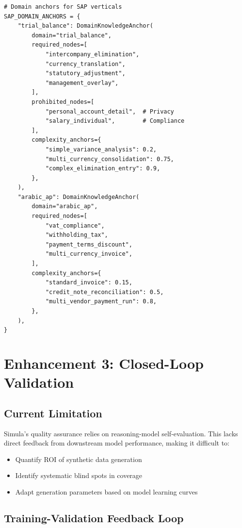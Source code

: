 \begin{lstlisting}[language=jsonx,caption={SAP S/4HANA domain calibration.}]
# Domain anchors for SAP verticals
SAP_DOMAIN_ANCHORS = {
    "trial_balance": DomainKnowledgeAnchor(
        domain="trial_balance",
        required_nodes=[
            "intercompany_elimination",
            "currency_translation",
            "statutory_adjustment",
            "management_overlay",
        ],
        prohibited_nodes=[
            "personal_account_detail",  # Privacy
            "salary_individual",        # Compliance
        ],
        complexity_anchors={
            "simple_variance_analysis": 0.2,
            "multi_currency_consolidation": 0.75,
            "complex_elimination_entry": 0.9,
        },
    ),
    "arabic_ap": DomainKnowledgeAnchor(
        domain="arabic_ap",
        required_nodes=[
            "vat_compliance",
            "withholding_tax",
            "payment_terms_discount",
            "multi_currency_invoice",
        ],
        complexity_anchors={
            "standard_invoice": 0.15,
            "credit_note_reconciliation": 0.5,
            "multi_vendor_payment_run": 0.8,
        },
    ),
}
\end{lstlisting}


\section{Enhancement 3: Closed-Loop Validation}

\subsection{Current Limitation}

Simula's quality assurance relies on reasoning-model self-evaluation. This lacks
direct feedback from downstream model performance, making it difficult to:
\begin{itemize}
  \item Quantify ROI of synthetic data generation
  \item Identify systematic blind spots in coverage
  \item Adapt generation parameters based on model learning curves
\end{itemize}

\subsection{Training-Validation Feedback Loop}

